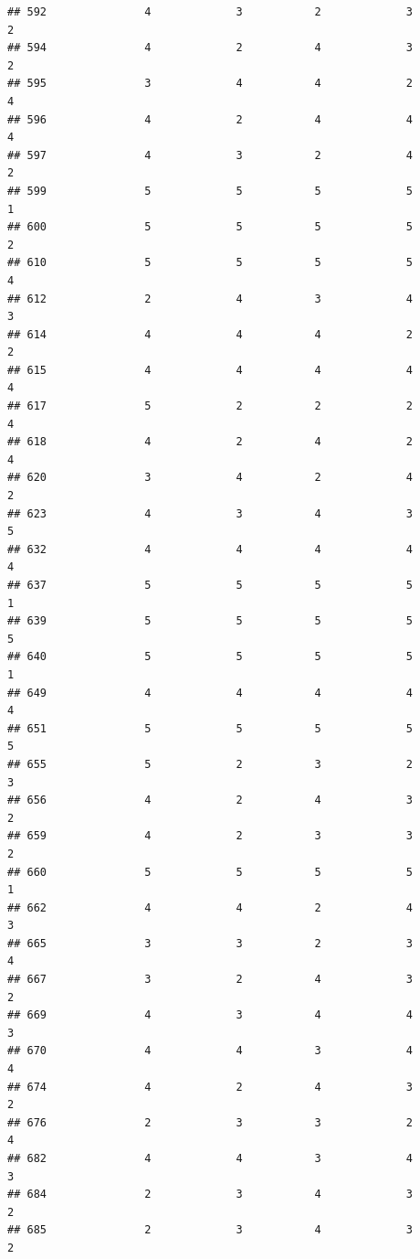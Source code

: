 \documentclass[
]{article}
\begin{document}
\begin{verbatim}
## 592               4             3           2             3            2
## 594               4             2           4             3            2
## 595               3             4           4             2            4
## 596               4             2           4             4            4
## 597               4             3           2             4            2
## 599               5             5           5             5            1
## 600               5             5           5             5            2
## 610               5             5           5             5            4
## 612               2             4           3             4            3
## 614               4             4           4             2            2
## 615               4             4           4             4            4
## 617               5             2           2             2            4
## 618               4             2           4             2            4
## 620               3             4           2             4            2
## 623               4             3           4             3            5
## 632               4             4           4             4            4
## 637               5             5           5             5            1
## 639               5             5           5             5            5
## 640               5             5           5             5            1
## 649               4             4           4             4            4
## 651               5             5           5             5            5
## 655               5             2           3             2            3
## 656               4             2           4             3            2
## 659               4             2           3             3            2
## 660               5             5           5             5            1
## 662               4             4           2             4            3
## 665               3             3           2             3            4
## 667               3             2           4             3            2
## 669               4             3           4             4            3
## 670               4             4           3             4            4
## 674               4             2           4             3            2
## 676               2             3           3             2            4
## 682               4             4           3             4            3
## 684               2             3           4             3            2
## 685               2             3           4             3            2

\end{verbatim}
\end{document}
